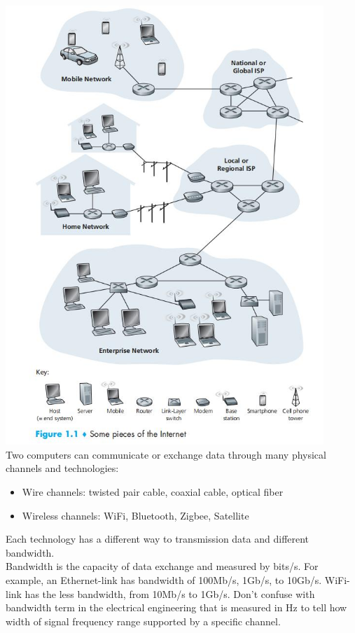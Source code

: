 \documentclass[a4paper, 11pt]{article}
\begin{document}
\includegraphics[width=12cm]{pieces-of-internet.png}\\

Two computers can communicate or exchange data through many physical channels and technologies:\\
\begin{itemize}
\item Wire channels: twisted pair cable, coaxial cable, optical fiber
\item Wireless channels: WiFi, Bluetooth, Zigbee, Satellite
\end{itemize}

Each technology has a different way to transmission data and different bandwidth.\\

Bandwidth is the capacity of data exchange and measured by bits/s. For example, an Ethernet-link has bandwidth of 100Mb/s, 1Gb/s, to 10Gb/s. WiFi-link has the less bandwidth, from 10Mb/s to 1Gb/s. Don't confuse with bandwidth term in the electrical engineering that is measured in Hz to tell how width of signal frequency range supported by a specific channel.\\
\end{document}
